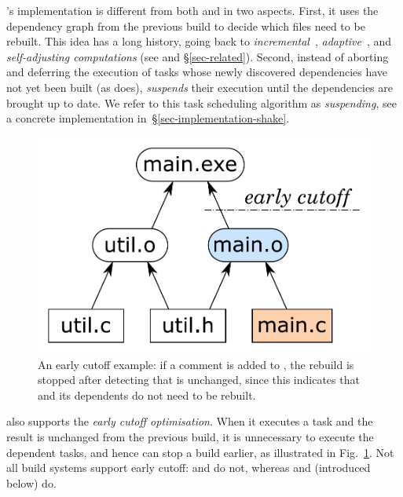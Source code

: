 \Shake's implementation is different from both \Make and \Excel in two aspects.
First, it uses the dependency graph from the previous build to decide which
files need to be rebuilt. This idea has a long history, going back to
\emph{incremental}~\cite{demers1981incremental},
\emph{adaptive}~\cite{acar2002adaptive}, and
\emph{self-adjusting computations} (see \cite{acar2007selfadjusting} and
\S\ref{sec-related}). Second, instead of aborting and deferring the execution of
tasks whose newly discovered dependencies have not yet been built (as \Excel
does), \Shake \emph{suspends} their execution until the dependencies are brought
up to date. We refer to this task scheduling algorithm as \emph{suspending},
see a concrete implementation in~\S\ref{sec-implementation-shake}.

\begin{figure}
\centerline{\includegraphics[scale=0.28]{fig/shake-example-cutoff.pdf}}
\caption{An early cutoff example: if a comment is added to , the
rebuild is stopped after detecting that  is unchanged, since this
indicates that  and its dependents do not need to be
rebuilt.\label{fig-cutoff}}
\end{figure}

\Shake also supports the \emph{early cutoff optimisation}. When it
executes a task and the result is unchanged from the previous build, it is
unnecessary to execute the dependent tasks, and hence \Shake can stop a build
earlier, as illustrated in Fig.~\ref{fig-cutoff}. Not all build systems support
early cutoff: \Make and \Excel do not, whereas \Shake and \Bazel (introduced
below) do.

